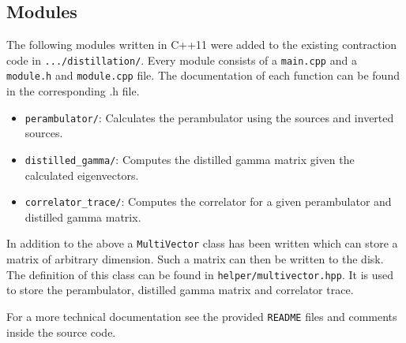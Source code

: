 \subsection{Modules}
    The following modules written in C++11 were added to the existing contraction code in \verb+.../distillation/+. Every module consists of a \verb+main.cpp+ and a \verb+module.h+ and \verb+module.cpp+ file. The documentation of each function can be found in the corresponding .h file.  
    \begin{itemize}
        \item \verb+perambulator/+: Calculates the perambulator using the sources and inverted sources.
        \item \verb+distilled_gamma/+: Computes the distilled gamma matrix given the calculated eigenvectors.
        \item \verb+correlator_trace/+: Computes the correlator for a given perambulator and distilled gamma matrix.
    \end{itemize}
    
    In addition to the above a \verb+MultiVector+ class has been written which can store a matrix of arbitrary dimension. Such a matrix can then be written to the disk. The definition of this class can be found in \verb+helper/multivector.hpp+. It is used to store the perambulator, distilled gamma matrix and correlator trace.
    
    For a more technical documentation see the provided \verb+README+ files and comments inside the source code.
    
